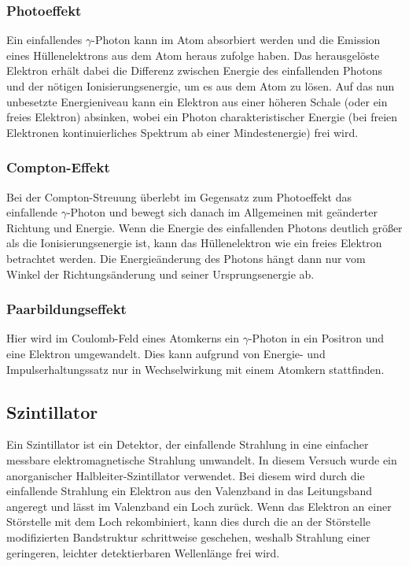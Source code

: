 \documentclass[
	a4paper,
	12pt,
	pagesize,
	ngerman
]{scrartcl}
\begin{document}
	\subsubsection{Photoeffekt}
	Ein einfallendes $\gamma$-Photon kann im Atom absorbiert werden und die Emission eines Hüllenelektrons aus dem Atom heraus zufolge haben.
	Das herausgelöste Elektron erhält dabei die Differenz zwischen Energie des einfallenden Photons und der nötigen Ionisierungsenergie, um es aus dem Atom zu lösen.
	Auf das nun unbesetzte Energieniveau kann ein Elektron aus einer höheren Schale (oder ein freies Elektron) absinken, wobei ein Photon charakteristischer Energie (bei freien Elektronen kontinuierliches Spektrum ab einer Mindestenergie) frei wird. %

	\subsubsection{Compton-Effekt}
	Bei der Compton-Streuung überlebt im Gegensatz zum Photoeffekt das einfallende $\gamma$-Photon und bewegt sich danach im Allgemeinen mit geänderter Richtung und Energie.
	Wenn die Energie des einfallenden Photons deutlich größer als die Ionisierungsenergie ist, kann das Hüllenelektron wie ein freies Elektron betrachtet werden.
	Die Energieänderung des Photons hängt dann nur vom Winkel der Richtungsänderung und seiner Ursprungsenergie ab.

	\subsubsection{Paarbildungseffekt}

	Hier wird im Coulomb-Feld eines Atomkerns ein $\gamma$-Photon in ein Positron und eine Elektron umgewandelt.
	Dies kann aufgrund von Energie- und Impulserhaltungssatz nur in Wechselwirkung mit einem Atomkern stattfinden.

	\subsection{Szintillator}

	Ein Szintillator ist ein Detektor, der einfallende Strahlung in eine einfacher messbare elektromagnetische Strahlung umwandelt.
	In diesem Versuch wurde ein anorganischer Halbleiter-Szintillator verwendet.
	Bei diesem wird durch die einfallende Strahlung ein Elektron aus den Valenzband in das Leitungsband angeregt und lässt im Valenzband ein Loch zurück.
	Wenn das Elektron an einer Störstelle mit dem Loch rekombiniert, kann dies durch die an der Störstelle modifizierten Bandstruktur schrittweise geschehen, weshalb Strahlung einer geringeren, leichter detektierbaren Wellenlänge frei wird.
\end{document}
